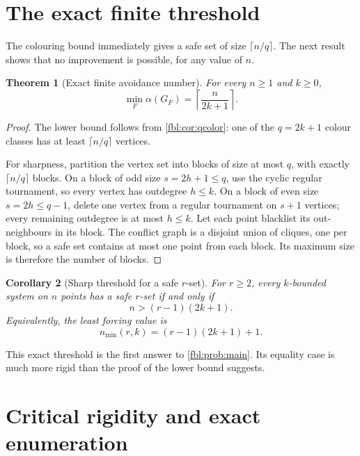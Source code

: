 \documentclass[11pt]{article}
\newtheorem{theorem}{Theorem}[section]
\newtheorem{corollary}[theorem]{Corollary}
\theoremstyle{definition}
\theoremstyle{remark}
\begin{document}
\section{The exact finite threshold}

The colouring bound immediately gives a safe set of size
$\lceil n/q\rceil$.  The next result shows that no improvement is possible,
for any value of $n$.

\begin{theorem}[Exact finite avoidance number]\label{fbl:thm:alpha}
For every $n\ge1$ and $k\ge0$,
\begin{equation}\label{fbl:eq:alpha}
  \min_F \alpha(G_F)
  =
  \left\lceil\frac{n}{2k+1}\right\rceil.
\end{equation}
\end{theorem}

\begin{proof}
The lower bound follows from \cref{fbl:cor:qcolor}: one of the $q=2k+1$ colour
classes has at least $\lceil n/q\rceil$ vertices.

For sharpness, partition the vertex set into blocks of size at most $q$, with
exactly $\lceil n/q\rceil$ blocks.  On a block of odd size $s=2h+1\le q$,
use the cyclic regular tournament, so every vertex has outdegree $h\le k$.
On a block of even size $s=2h\le q-1$, delete one vertex from a regular
tournament on $s+1$ vertices; every remaining outdegree is at most $h\le k$.
Let each point blacklist its out-neighbours in its block.  The conflict graph
is a disjoint union of cliques, one per block, so a safe set contains at most
one point from each block.  Its maximum size is therefore the number of
blocks.
\end{proof}

\begin{corollary}[Sharp threshold for a safe $r$-set]\label{fbl:cor:threshold}
For $r\ge2$, every $k$-bounded system on $n$ points has a safe $r$-set if
and only if
\begin{equation}\label{fbl:eq:threshold}
       n>(r-1)(2k+1).
\end{equation}
Equivalently, the least forcing value is
\[
       n_{\min}(r,k)=(r-1)(2k+1)+1.
\]
\end{corollary}

This exact threshold is the first answer to
\cref{fbl:prob:main}.  Its equality case is much more rigid than the proof of the
lower bound suggests.

\section{Critical rigidity and exact enumeration}\label{fbl:sec:critical}
\end{document}
